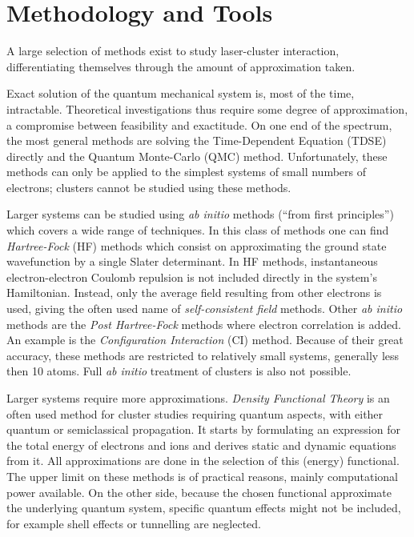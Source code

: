 \clearpage
\section{Methodology and Tools}
\label{section:tools}

A large selection of methods exist to study laser-cluster interaction,
differentiating themselves through the amount of approximation taken.

Exact solution of the quantum mechanical system is, most of the time,
intractable. Theoretical investigations thus require some degree of
approximation, a compromise between feasibility and exactitude. On one end of
the spectrum, the most general methods are solving the
Time-Dependent \schrodinger Equation (TDSE) directly and the Quantum Monte-Carlo
(QMC) method. Unfortunately, these methods can only be applied to the simplest
systems of small numbers of electrons; clusters cannot be studied using these
methods.


Larger systems can be studied using \textit{ab initio} methods (``from
first principles'') which covers a wide range of techniques. In this class of
methods one can find \textit{Hartree-Fock} (HF) methods which consist on
approximating the ground state wavefunction by a single Slater determinant.
In HF methods, instantaneous electron-electron Coulomb repulsion is not
included directly in the system's Hamiltonian. Instead, only the average field
resulting from other electrons is used, giving the often used name of
\textit{self-consistent field} methods. Other \textit{ab
initio} methods are the \textit{Post Hartree-Fock} methods where electron
correlation is added. An example is the \textit{Configuration Interaction} (CI)
method. Because of their great accuracy, these methods are restricted to
relatively small systems, generally less then 10 atoms. Full \textit{ab initio}
treatment of clusters is also not possible.


Larger systems %
require
more approximations. \textit{Density Functional Theory}
is an often used method for cluster studies requiring quantum aspects, with
either quantum or semiclassical propagation. It starts by formulating an
expression for the total energy of electrons and ions and derives static and
dynamic equations from it. All approximations are done in the selection of this
(energy) functional. The upper limit on these methods is of practical reasons,
mainly computational power available. On the other side, because the chosen
functional approximate the underlying quantum system, specific quantum effects
might not be included, for example shell effects or tunnelling are neglected.

